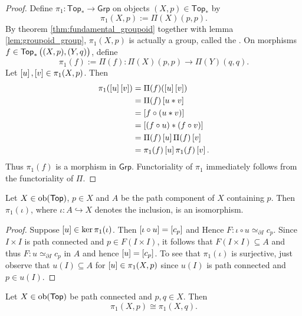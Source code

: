 \begin{proof}
	Define $\pi_1 : \mathsf{Top}_\ast \to \mathsf{Grp}$ on objects $(X,p) \in \mathsf{Top}_\ast$ by 
	\begin{equation*}
		\pi_1(X,p) := \Pi(X)(p,p).
	\end{equation*}
	By theorem \ref{thm:fundamental_groupoid} together with lemma \ref{lem:groupoid_group}, $\pi_1(X,p)$ is actually a group, called the . On morphisms $f \in \mathsf{Top}_\ast\del[1]{(X,p),(Y,q)}$, define 
	\begin{equation*}
		\pi_1(f) := \Pi(f) : \Pi(X)(p,p) \to \Pi(Y)(q,q).
	\end{equation*}
	Let $\sbr{u},\sbr{v} \in \pi_1(X,p)$. Then 
	\begin{align*}
		\pi_1(\sbr{u}\sbr{v}) &= \Pi(f)(\sbr{u}\sbr{v})\\
		&= \Pi(f)\sbr{u \ast v}\\
		&= \sbr[0]{f \circ (u \ast v)}\\
		&= \sbr[0]{(f \circ u) \ast (f \circ v)}\\
		&= \Pi(f)\sbr{u} \Pi(f)\sbr{v}\\
		&= \pi_1(f)\sbr{u}\pi_1(f)\sbr{v}.
	\end{align*}
	Thus $\pi_1(f)$ is a morphism in $\mathsf{Grp}$. Functoriality of $\pi_1$ immediately follows from the functoriality of $\Pi$.
\end{proof}

\begin{lemma}
	Let $X \in \operatorname{ob}(\mathsf{Top})$, $p \in X$ and $A$ be the path component of $X$ containing $p$. Then $\pi_1(\iota)$, where $\iota : A \hookrightarrow X$ denotes the inclusion, is an isomorphism.
\end{lemma}

\begin{proof}
	Suppose $\sbr{u} \in \ker\pi_1(\iota)$. Then $\sbr{\iota \circ u} = \sbr[0]{c_p}$ and Hence $F : \iota \circ u \simeq_{\partial I} c_p$. Since $I \times I$ is path connected and $p \in F(I \times I)$, it follows that $F(I \times I) \subseteq A$ and thus $F : u \simeq_{\partial I} c_p$ in $A$ and hence $\sbr{u} = \sbr[0]{c_p}$. To see that $\pi_1(\iota)$ is surjective, just observe that $u(I) \subseteq A$ for $\sbr{u} \in \pi_1(X,p)$ since $u(I)$ is path connected and $p \in u(I)$.
\end{proof}

\begin{lemma}
	Let $X \in \operatorname{ob}(\mathsf{Top})$ be path connected and $p,q \in X$. Then 
	\begin{equation*}
		\pi_1(X,p) \cong \pi_1(X,q).	
	\end{equation*}
	\label{lem:fundamental_group_path_connected}
\end{lemma}

